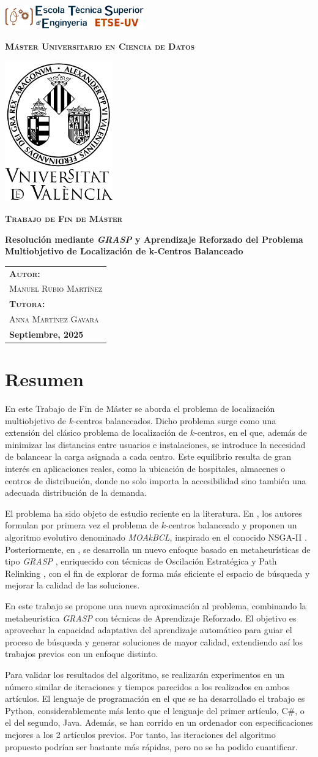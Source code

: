 \documentclass[12pt,a4paper]{book}
\newcommand{\nuevaportada}[6]{
    \thispagestyle{empty}
    \begin{center}
        \vfill 
        
        \includegraphics[width=0.45\textwidth]{images/logo.png}
        
        \vspace{0.5cm} %
        {\large\bfseries\textsc{M\'aster Universitario en #1}\par} %
        
        \vspace{0.5cm}
        \includegraphics[width=0.35\textwidth]{images/uv.png} %
        
        \vspace{0.5cm}
        {\large\bfseries\textsc{Trabajo de Fin de M\'aster}\par} %
        
        \vfill 
        
        {\LARGE\bfseries #2\par} %
        
        \vfill %
        
        \begin{flushright}
            \begin{tabular}{l} 
                {\large\bfseries\textsc{Autor:}} \\
                {\large\textsc{#3}} \\ [0.2cm] %
                {\large\bfseries\textsc{Tutora:}} \\ 
                {\large\textsc{#4}} \\ [0.2cm] %
                {\large\bfseries #5} 
            \end{tabular}
        \end{flushright}
        
        \vfill %
    \end{center}
}
\begin{document}
\nuevaportada{Ciencia de Datos}{Resolución mediante \textit{GRASP} y Aprendizaje Reforzado del Problema Multiobjetivo de Localización de k-Centros Balanceado }{Manuel Rubio Martínez}{Anna Martínez Gavara}{Septiembre, 2025}

\clearpage

\newpage
\tableofcontents

\newpage

\section*{Resumen}
En este Trabajo de Fin de Máster se aborda el problema de localización multiobjetivo de $k$-centros balanceados. Dicho problema surge como una extensión del clásico problema de localización de $k$-centros, en el que, además de minimizar las distancias entre usuarios e instalaciones, se introduce la necesidad de balancear la carga asignada a cada centro. Este equilibrio resulta de gran interés en aplicaciones reales, como la ubicación de hospitales, almacenes o centros de distribución, donde no solo importa la accesibilidad sino también una adecuada distribución de la demanda.

El problema ha sido objeto de estudio reciente en la literatura. En \cite{k-balanced_1}, los autores formulan por primera vez el problema de $k$-centros balanceado y proponen un algoritmo evolutivo denominado \textit{MOAkBCL}, inspirado en el conocido NSGA-II \citep{NSGA-II}. Posteriormente, en \cite{k-Balanced_2}, se desarrolla un nuevo enfoque basado en metaheurísticas de tipo \textit{GRASP} \citep{GRASP}, enriquecido con técnicas de Oscilación Estratégica \citep{oscillation} y Path Relinking \citep{path_relinking}, con el fin de explorar de forma más eficiente el espacio de búsqueda y mejorar la calidad de las soluciones.

En este trabajo se propone una nueva aproximación al problema, combinando la metaheurística \textit{GRASP} con técnicas de Aprendizaje Reforzado. El objetivo es aprovechar la capacidad adaptativa del aprendizaje automático para guiar el proceso de búsqueda y generar soluciones de mayor calidad, extendiendo así los trabajos previos con un enfoque distinto. 

Para validar los resultados del algoritmo, se realizarán experimentos en un número similar de iteraciones y tiempos parecidos a los realizados en ambos artículos. El lenguaje de programación en el que se ha desarrollado el trabajo es Python, considerablemente más lento que el lenguaje del primer artículo, C\#, o el del segundo, Java. Además, se han corrido en un ordenador con especificaciones mejores a los 2 artículos previos. Por tanto, las iteraciones del algoritmo propuesto podrían ser bastante
más rápidas, pero no se ha podido cuantificar.
\newpage
\end{document}

